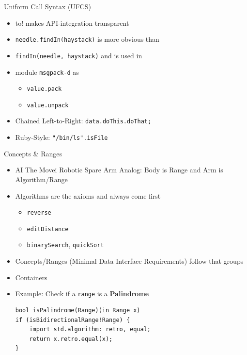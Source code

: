 \documentclass[xcolor=dvipsnames]{beamer}
\begin{document}
\begin{frame}[fragile]{Uniform Call Syntax (UFCS)}
  \begin{itemize}[<+->]
  \item to! makes API-integration transparent
  \item \texttt{needle.findIn(haystack)} is more obvious than
  \item \texttt{findIn(needle, haystack)} and is used in
  \item module \texttt{msgpack-d} as
    \begin{itemize}[<+->]
    \item \texttt{value.pack}
    \item \texttt{value.unpack}
    \end{itemize}
  \item Chained Left-to-Right: \texttt{data.doThis.doThat;}
  \item Ruby-Style: \texttt{"/bin/ls".isFile}
  \end{itemize}
\end{frame}


\begin{frame}[fragile]{Concepts \& Ranges}
    \begin{itemize}[<+->]
    \item AI The Movei Robotic Spare Arm Analog: Body is Range and Arm is
      Algorithm/Range
    \item Algorithms are the axioms and always come first
      \begin{itemize}[<+->]
      \item \texttt{reverse}
      \item \texttt{editDistance}
      \item \texttt{binarySearch}, \texttt{quickSort}
      \end{itemize}
    \item Concepts/Ranges (Minimal Data Interface Requirements) follow that groups
    \item Containers
    \item Example: Check if a \texttt{range} is a \textbf{Palindrome}
    \begin{lstlisting}[frame=single]
bool isPalindrome(Range)(in Range x)
if (isBidirectionalRange!Range) {
    import std.algorithm: retro, equal;
    return x.retro.equal(x);
}
    \end{lstlisting}
    \end{itemize}
\end{frame}
\end{document}
